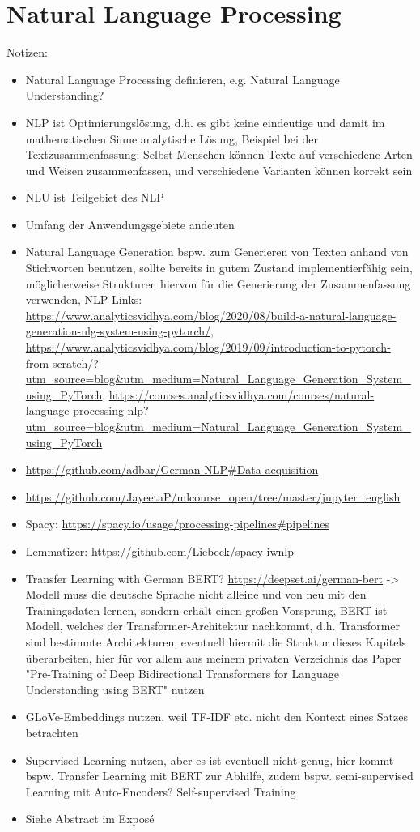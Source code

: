 \chapter{Natural Language Processing}
\thispagestyle{fancy}
\label{chap:Natural Language Processing}

Notizen:
\begin{itemize}
	\item Natural Language Processing definieren, e.g. Natural Language Understanding?
	\item NLP ist Optimierungslösung, d.h. es gibt keine eindeutige und damit im mathematischen Sinne analytische Lösung, Beispiel bei der Textzusammenfassung: Selbst Menschen können Texte auf verschiedene Arten und Weisen zusammenfassen, und verschiedene Varianten können korrekt sein
	\item NLU ist Teilgebiet des NLP	
	\item Umfang der Anwendungsgebiete andeuten
	\item Natural Language Generation bspw. zum Generieren von Texten anhand von Stichworten benutzen, sollte bereits in gutem Zustand implementierfähig sein, möglicherweise Strukturen hiervon für die Generierung der Zusammenfassung verwenden, NLP-Links: \url{https://www.analyticsvidhya.com/blog/2020/08/build-a-natural-language-generation-nlg-system-using-pytorch/}, \url{https://www.analyticsvidhya.com/blog/2019/09/introduction-to-pytorch-from-scratch/?utm_source=blog&utm_medium=Natural_Language_Generation_System_using_PyTorch}, \url{https://courses.analyticsvidhya.com/courses/natural-language-processing-nlp?utm_source=blog&utm_medium=Natural_Language_Generation_System_using_PyTorch}
	\item \url{https://github.com/adbar/German-NLP#Data-acquisition}
	\item \url{https://github.com/JayeetaP/mlcourse_open/tree/master/jupyter_english}
	\item Spacy: \url{https://spacy.io/usage/processing-pipelines#pipelines}
	\item Lemmatizer: \url{https://github.com/Liebeck/spacy-iwnlp}
	\item Transfer Learning with German BERT? \url{https://deepset.ai/german-bert} -> Modell muss die deutsche Sprache nicht alleine und von neu  mit den Trainingsdaten lernen, sondern erhält einen großen Vorsprung, BERT ist Modell, welches der Transformer-Architektur nachkommt, d.h. Transformer sind bestimmte Architekturen, eventuell hiermit die Struktur dieses Kapitels überarbeiten, hier für vor allem aus meinem privaten Verzeichnis das Paper "Pre-Training of Deep Bidirectional Transformers for Language Understanding using BERT" nutzen
	\item GLoVe-Embeddings nutzen, weil TF-IDF etc. nicht den Kontext eines Satzes betrachten
	\item Supervised Learning nutzen, aber es ist eventuell nicht genug, hier kommt bspw. Transfer Learning mit BERT zur Abhilfe, zudem bspw. semi-supervised Learning mit Auto-Encoders? Self-supervised Training
	\item Siehe Abstract im Exposé
\end{itemize}


